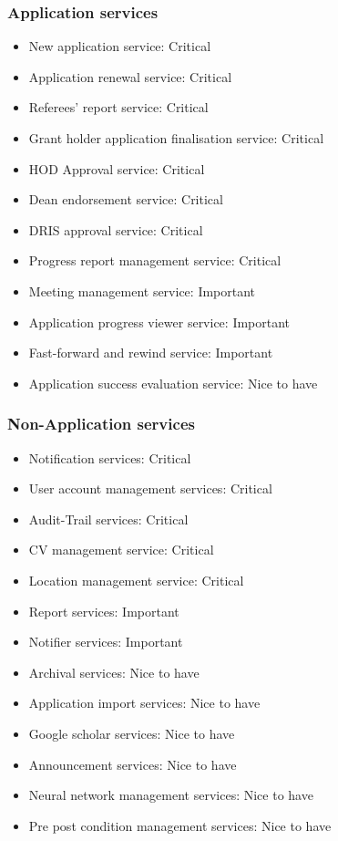 \documentclass[12pt]{article}
\begin{document}
\subsubsection{Application services}
\begin{itemize}
	\item New application service: Critical
	\item Application renewal service: Critical
	\item Referees' report service: Critical
	\item Grant holder application finalisation service: Critical
	\item HOD Approval service: Critical
	\item Dean endorsement service: Critical
	\item DRIS approval service: Critical
	\item Progress report management service: Critical		
	\item Meeting management service: Important
	\item Application progress viewer service: Important
	\item Fast-forward and rewind service: Important
	\item Application success evaluation service: Nice to have 		
\end{itemize}

\subsubsection{Non-Application services}
\begin{itemize}
	\item Notification services: Critical
	\item User account management services: Critical
	\item Audit-Trail services: Critical
	\item CV management service: Critical
	\item Location management service: Critical
	\item Report services: Important
	\item Notifier services: Important
	\item Archival services: Nice to have
	\item Application import services: Nice to have
	\item Google scholar services: Nice to have
	\item Announcement services: Nice to have
	\item Neural network management services: Nice to have
	\item Pre post condition management services: Nice to have								
\end{itemize}
\end{document}
